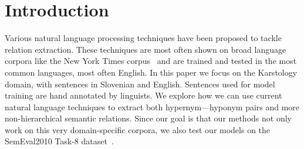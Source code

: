 \documentclass[fleqn,moreauthors,10pt]{ds_report}
\affiliation{\textit{Advisors: Slavko Žitnik, Špela Vintar}}
\begin{document}
\flushbottom 

\maketitle 

\thispagestyle{empty} 



\section{Introduction}
Various natural language processing techniques have been proposed to tackle relation extraction. These techniques are most often shown on broad language corpora like the New York Times corpus~\cite{sandhaus2008new} and are trained and tested in the most common languages, most often English. In this paper we focus on the Karstology domain, with sentences in Slovenian and English. Sentences used for model training are hand annotated by linguists. We explore how we can use current natural language techniques to extract both hypernym---hyponym pairs and more non-hierarchical semantic relations.  Since our goal is that our methods not only work on this very domain-specific corpora, we also test our models on the SemEval2010 Task-8 dataset~\cite{hendrickx-etal-2010-semeval}. 
\end{document}
